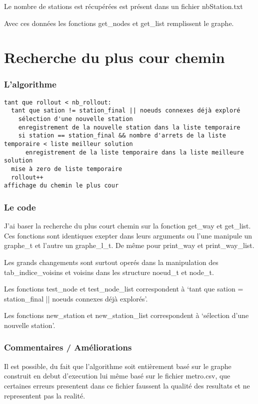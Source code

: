 \documentclass[12pt, twoside]{report}
\begin{document}
Le nombre de stations est récupérées est présent dans un fichier nbStation.txt


Avec ces données les fonctions get\_nodes et get\_list remplissent le graphe.
\part{Recherche du plus cour chemin}
\section{L'algorithme}
\begin{verbatim}
tant que rollout < nb_rollout:
  tant que sation != station_final || noeuds connexes déjà exploré
    sélection d'une nouvelle station
    enregistrement de la nouvelle station dans la liste temporaire
    si station == station_final && nombre d'arrets de la liste temporaire < liste meilleur solution
      enregistrement de la liste temporaire dans la liste meilleure solution
  mise à zero de liste temporaire
  rollout++
affichage du chemin le plus cour
\end{verbatim}

\section{Le code}
J'ai baser la recherche du plus court chemin sur la fonction get\_way et get\_list.
Ces fonctions sont identiques exepter dans leurs arguments ou l'une manipule un graphe\_t et l'autre un graphe\_l\_t.\newline
De même pour print\_way et print\_way\_list.


Les grands changements sont surtout operés dans la manipulation des tab\_indice\_voisins et voisins dans les structure noeud\_t et node\_t.


Les fonctions test\_node et test\_node\_list correspondent à `tant que sation \!= station\_final || noeuds connexes déjà explorés'.


Les fonctions new\_station et new\_station\_list correspondent à `sélection d'une nouvelle station'.

\section{Commentaires / Améliorations}

Il est possible, du fait que l'algorithme soit entièrement basé sur le graphe construit en debut d'execution lui même basé sur le fichier metro.csv, que certaines erreurs presentent dans ce fichier faussent la qualité des resultats et ne representent pas la realité.
\end{document}
